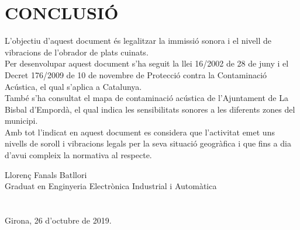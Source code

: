 \chapter{\uppercase{Conclusió}}
L'objectiu d'aquest document és legalitzar la immissió sonora i el nivell de vibracions de l'obrador de plats cuinats.\\
\newline Per desenvolupar aquest document s'ha seguit la llei 16/2002 de 28 de juny i el Decret 176/2009 de 10 de novembre de Protecció contra la Contaminació Acústica, el qual s'aplica a Catalunya.\\
\newline També s'ha consultat el mapa de contaminació acústica de l'Ajuntament de La Bisbal d'Empordà, el qual indica les sensibilitats sonores a les diferents zones del municipi.\\
\newline Amb tot l'indicat en aquest document es considera que l'activitat emet uns nivells de soroll i vibracions legals per la seva situació geogràfica i que fins a dia d'avui compleix la normativa al respecte.

\vspace*{\fill}
\noindent Llorenç Fanals Batllori\\
Graduat en Enginyeria Electrònica Industrial i Automàtica\\
\\
\\
Girona, 26 d'octubre de 2019.

\clearpage